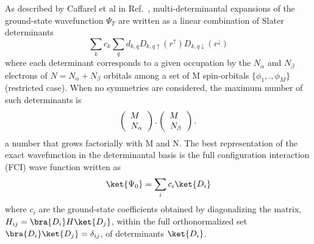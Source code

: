  As described by Caffarel et al in Ref.~\cite{Caffarel2013}, multi-determinantal expansions of the ground-state wavefunction $\Psi_T$ are written as a linear combination of Slater determinants
\begin{equation}
\sum_k c_k \sum_q d_{k,q}D_{k,q\uparrow } (r^{\uparrow})D_{k,q\downarrow}(r^{\downarrow}) %
\end{equation}
  where each determinant corresponds to a given occupation by the $N_{\alpha}$ and $N_{\beta}$ electrons of $N=N_{\alpha}+N_{\beta}$ orbitals among a set of M spin-orbitals $\{\phi_1,.,\phi_M\}$ (restricted case). When no symmetries are
considered, the maximum number of such determinants is
\begin{eqnarray}
\label{eqn:Det-Permutations}
\left(
\begin{array}{c} M \hspace{1.5mm} \\ N_{\alpha}  \end{array}
\right).
\left(
\begin{array}{c} M \hspace{1.5mm} \\ N_{\beta}  \end{array}
\right).
\end{eqnarray}
a number that grows factorially with M and N. The best representation of the exact wavefunction in the determinantal basis is the full configuration interaction (FCI) wave function written as 
\begin{equation}
\ket{\Psi_0}=\sum_{i} c_{i} \ket{D_i}
\end{equation}
where $c_i$ are the ground-state coefficients obtained by diagonalizing the matrix, $H_{ij}=\bra{D_i}H\ket{D_j}$, 
within the full orthonormalized set $\bra{D_i}\ket{D_j}=\delta_{ij}$,
 of determinants $\ket{D_i}$.\\ 

